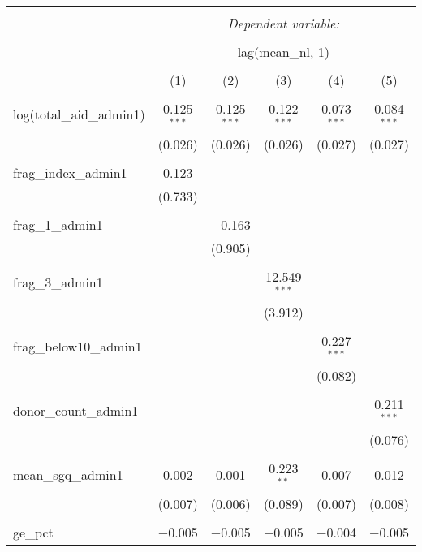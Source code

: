 
\begin{table}[!htbp] \centering 
  \caption{} 
  \label{} 
\begin{tabular}{@{\extracolsep{5pt}}lccccc} 
\\[-1.8ex]\hline 
\hline \\[-1.8ex] 
 & \multicolumn{5}{c}{\textit{Dependent variable:}} \\ 
\cline{2-6} 
\\[-1.8ex] & \multicolumn{5}{c}{lag(mean\_nl, 1)} \\ 
\\[-1.8ex] & (1) & (2) & (3) & (4) & (5)\\ 
\hline \\[-1.8ex] 
 log(total\_aid\_admin1) & 0.125$^{***}$ & 0.125$^{***}$ & 0.122$^{***}$ & 0.073$^{***}$ & 0.084$^{***}$ \\ 
  & (0.026) & (0.026) & (0.026) & (0.027) & (0.027) \\ 
  & & & & & \\ 
 frag\_index\_admin1 & 0.123 &  &  &  &  \\ 
  & (0.733) &  &  &  &  \\ 
  & & & & & \\ 
 frag\_1\_admin1 &  & $-$0.163 &  &  &  \\ 
  &  & (0.905) &  &  &  \\ 
  & & & & & \\ 
 frag\_3\_admin1 &  &  & 12.549$^{***}$ &  &  \\ 
  &  &  & (3.912) &  &  \\ 
  & & & & & \\ 
 frag\_below10\_admin1 &  &  &  & 0.227$^{***}$ &  \\ 
  &  &  &  & (0.082) &  \\ 
  & & & & & \\ 
 donor\_count\_admin1 &  &  &  &  & 0.211$^{***}$ \\ 
  &  &  &  &  & (0.076) \\ 
  & & & & & \\ 
 mean\_sgq\_admin1 & 0.002 & 0.001 & 0.223$^{**}$ & 0.007 & 0.012 \\ 
  & (0.007) & (0.006) & (0.089) & (0.007) & (0.008) \\ 
  & & & & & \\ 
 ge\_pct & $-$0.005 & $-$0.005 & $-$0.005 & $-$0.004 & $-$0.005 \\ 

\end{tabular}
\end{table}
